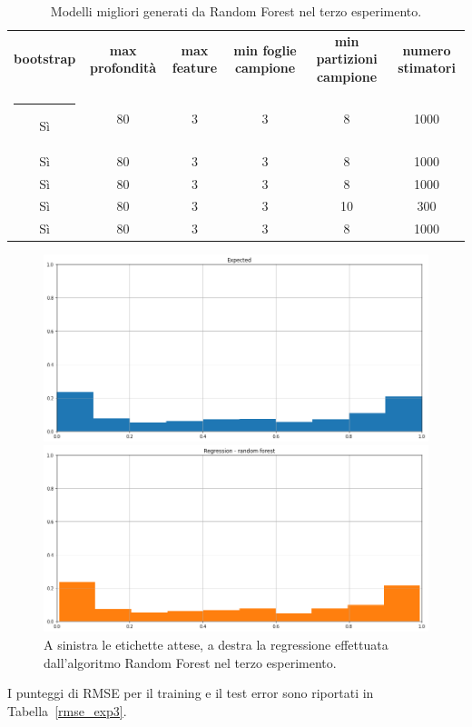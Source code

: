 \documentclass[12pt]{report}
\makeatletter
\theoremstyle{definition}
\newcommand{\thickhline}{%
    \noalign {\ifnum 0=`}\fi \hrule height 1pt
    \futurelet \reserved@a \@xhline
}
\makeatother
\begin{document}
\begin{table}
\centering
\begin{adjustbox}{max width=\textwidth}
 \begin{tabular}{|c|c|c|c|c|c|} 
 \hline
\textbf{bootstrap} & \textbf{max profondità} & \textbf{max feature} & \textbf{min foglie campione} & \textbf{min partizioni campione} & \textbf{numero stimatori}
\\ [0.5ex] 
 \thickhline
 Sì & 80 & 3 & 3 & 8 & 1000 \\ 
 Sì & 80 & 3 & 3 & 8 & 1000 \\ 
 Sì & 80 & 3 & 3 & 8 & 1000 \\ 
 Sì & 80 & 3 & 3 & 10 & 300 \\ 
 Sì & 80 & 3 & 3 & 8 & 1000 \\ 
 \hline
\end{tabular}
\end{adjustbox}
\caption{Modelli migliori generati da Random Forest nel terzo esperimento.}
\label{models_rf_exp3}
\end{table}

\begin{figure}
\centering
    \begin{minipage}{0.48\textwidth}
        \includegraphics[width=\linewidth]{images/experiment_beta05_disgiunti/expected_memberships.png}
    \end{minipage}
    \begin{minipage}{0.48\textwidth}
        \includegraphics[width=\linewidth]{images/experiment_beta05_disgiunti/prediction_regression_rf.png}
    \end{minipage}
    \caption{A sinistra le etichette attese, a destra la regressione effettuata dall'algoritmo Random Forest nel terzo esperimento.}
    \label{rf_exp3}
\end{figure} 
I punteggi di RMSE per il training e il test error sono riportati in Tabella~\ref{rmse_exp3}.
\end{document}
